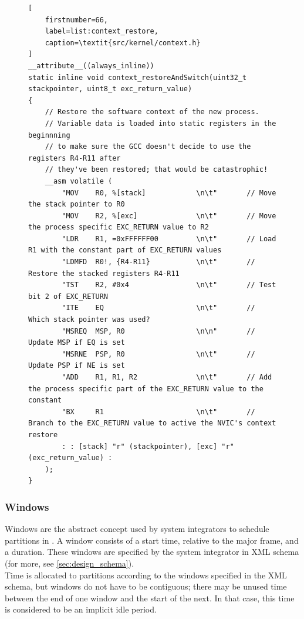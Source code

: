 \begin{figure}[H]
\lstset{
	language=C,
	basicstyle=\footnotesize,
	showspaces=false,
	showtabs=false,
	showstringspaces=false,
	tabsize=4,
	breaklines=true
}
\begin{lstlisting}[
	firstnumber=66,
	label=list:context_restore,
	caption=\textit{src/kernel/context.h}
]
__attribute__((always_inline))
static inline void context_restoreAndSwitch(uint32_t stackpointer, uint8_t exc_return_value)
{
    // Restore the software context of the new process.
    // Variable data is loaded into static registers in the beginnning
    // to make sure the GCC doesn't decide to use the registers R4-R11 after
    // they've been restored; that would be catastrophic!
    __asm volatile (
        "MOV	R0, %[stack]			\n\t"		// Move the stack pointer to R0
        "MOV	R2, %[exc]				\n\t"		// Move the process specific EXC_RETURN value to R2
        "LDR	R1, =0xFFFFFF00 		\n\t"		// Load R1 with the constant part of EXC_RETURN values
        "LDMFD  R0!, {R4-R11}     		\n\t"		// Restore the stacked registers R4-R11
        "TST	R2, #0x4    			\n\t"		// Test bit 2 of EXC_RETURN
        "ITE	EQ      				\n\t"		// Which stack pointer was used?
        "MSREQ	MSP, R0		 			\n\n"		// Update MSP if EQ is set
        "MSRNE 	PSP, R0					\n\t"		// Update PSP if NE is set
        "ADD	R1, R1, R2				\n\t"		// Add the process specific part of the EXC_RETURN value to the constant
        "BX		R1						\n\t"		// Branch to the EXC_RETURN value to active the NVIC's context restore
        : : [stack] "r" (stackpointer), [exc] "r" (exc_return_value) :
    );
}
\end{lstlisting}
\end{figure}
\subsubsection{Windows}
\label{sssec:impl_windows}
Windows are the abstract concept used by system integrators to schedule
partitions in \arinc . A window consists of a start time, relative to the major
frame, and a duration. These windows are specified by the system integrator in
XML schema (for more, see \ref{sec:design_schema}).\\
Time is allocated to partitions according to the windows specified in the XML
schema, but windows do not have to be contiguous; there may be unused time
between the end of one window and the start of the next. In that case, this time
is considered to be an implicit idle period.\\

